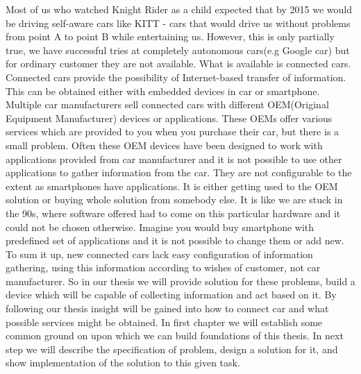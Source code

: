 Most of us who watched Knight Rider as a child expected that by 2015 we would be driving self-aware cars like KITT - cars that would drive us without problems from point A to point B while entertaining us. However, this is only partially true, we have successful tries at completely autonomous cars(e.g Google car) but for ordinary customer they are not available. What is available is connected cars. Connected cars provide the possibility of Internet-based transfer of information. This can be obtained either with embedded devices in car or smartphone. Multiple car manufacturers sell connected cars with different OEM(Original Equipment Manufacturer) devices or applications. These OEMs offer various services which are provided to you when you purchase their car, but there is a small problem. Often these OEM devices have been designed to work with applications provided from car manufacturer and it is not possible to use other applications to gather information from the car. They are not configurable to the extent as smartphones have applications. It is either getting used to the OEM solution or buying whole solution from somebody else. It is like we are stuck in the 90s, where software offered had to come on this particular hardware and it could not be chosen otherwise. Imagine you would buy smartphone with predefined set of applications and it is not possible to change them or add new. To sum it up, new connected cars lack easy configuration of information gathering, using this information according to wishes of customer, not car manufacturer. So in our thesis we will provide solution for these problems, build a device which will be capable of collecting information and act based on it. By following our thesis insight will be gained into how to connect car and what possible services might be obtained. In first chapter we will establish some common ground on upon which we can build foundations of this thesis. In next step we will describe the specification of problem, design a solution for it, and show implementation of the solution to this given task.
